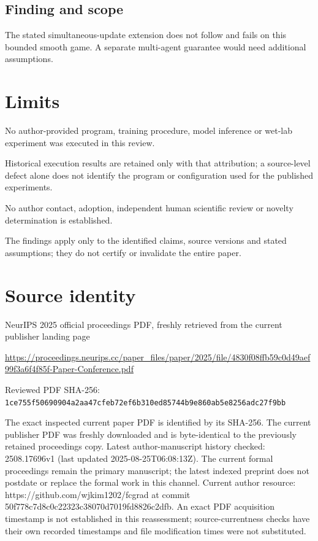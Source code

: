 \documentclass[11pt]{article}
\begin{document}
\subsection*{Finding and scope}

The stated simultaneous-update extension does not follow and fails on this bounded smooth game. A separate multi-agent guarantee would need additional assumptions.

\section*{Limits}

No author-provided program, training procedure, model inference or wet-lab experiment was executed in this review.\par

Historical execution results are retained only with that attribution; a source-level defect alone does not identify the program or configuration used for the published experiments.\par

No author contact, adoption, independent human scientific review or novelty determination is established.\par

The findings apply only to the identified claims, source versions and stated assumptions; they do not certify or invalidate the entire paper.\par

\section*{Source identity}

NeurIPS 2025 official proceedings PDF, freshly retrieved from the current publisher landing page

\url{https://proceedings.neurips.cc/paper_files/paper/2025/file/4830f08ffb59c0d49aef99f3a6f4f85f-Paper-Conference.pdf}

Reviewed PDF SHA-256: \nolinkurl{1ce755f50690904a2aa47cfeb72ef6b310ed85744b9e860ab5e8256adc27f9bb}

The exact inspected current paper PDF is identified by its SHA-256. The current publisher PDF was freshly downloaded and is byte-identical to the previously retained proceedings copy. Latest author-manuscript history checked: 2508.17696v1 (last updated 2025-08-25T06:08:13Z). The current formal proceedings remain the primary manuscript; the latest indexed preprint does not postdate or replace the formal work in this channel. Current author resource: https://github.com/wjkim1202/fcgrad at commit 50f778c7d8c0c22323c38070d7019fd8826c2dfb.  An exact PDF acquisition timestamp is not established in this reassessment; source-currentness checks have their own recorded timestamps and file modification times were not substituted.
\end{document}
